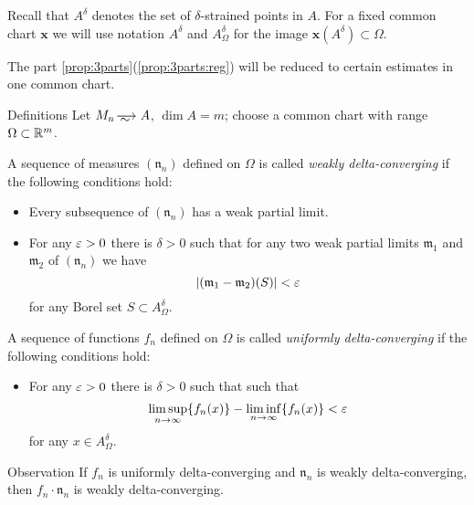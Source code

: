 Recall that $A^\delta$ denotes the set of $\delta$-strained points in $A$.
For a fixed common chart $\bm{x}$ we will use notation $A^\delta$ and $A^\delta_\Omega$ for the image $\bm{x}(A^\delta)\subset \Omega$.

The part \ref{prop:3parts}(\ref{prop:3parts:reg}) will be reduced to certain estimates in one common chart.

\begin{thm}{Definitions}\label{def:delta-converge}
Let $M_n\smooths{} A$, $\dim A=m$;
choose a common chart with range $\Omega\subset \mathbb{R}^m$.

A sequence of measures $(\mathfrak n_n)$ defined on $\Omega$ is called \emph{weakly delta-converging}
if the following conditions hold:
\begin{itemize}
 \item Every subsequence of $(\mathfrak n_n)$ has a weak partial limit.
 \item For any $\varepsilon>0$ there is $\delta>0$ such that for any two weak partial limits $\mathfrak m_1$ and $\mathfrak m_2$ of $(\mathfrak n_n)$ we have  
\[|(\mathfrak m_1-\mathfrak m_2)(S)|<\varepsilon\]
for any Borel set $S\subset A^\delta_\Omega$.
\end{itemize}

A sequence of functions $f_n$ defined on $\Omega$ is called \emph{uniformly delta-converging}
if the following conditions hold:
\begin{itemize}
 \item For any $\varepsilon>0$ there is $\delta>0$ such that such that 
\[\limsup_{n\to\infty} \{f_n(x)\}-\liminf_{n\to\infty}\{f_n(x)\}<  \varepsilon\]
for any $x\in A^\delta_\Omega$.
\end{itemize}

\end{thm}

\begin{thm}{Observation}\label{obs:delta-weak-uniform}
If $f_n$ is uniformly delta-converging and $\mathfrak n_n$ is weakly delta-converging,
then $f_n\cdot \mathfrak n_n$ is weakly delta-converging.
\end{thm}






